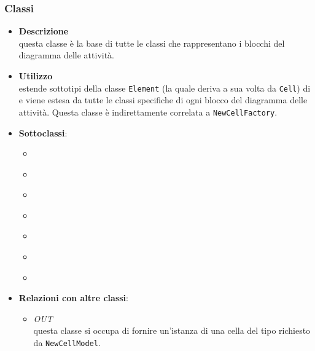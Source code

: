 \subsubsection{Classi}
\label{\nogloxy{swedesigner::client::model::celltypes::activity::ActivityDiagramElement}}
\begin{itemize}
\item \textbf{Descrizione}\\
questa classe è la base di tutte le classi che rappresentano i blocchi del diagramma delle attività.
\item \textbf{Utilizzo}\\
estende sottotipi della classe \texttt{Element} (la quale deriva a sua volta da \texttt{Cell})  di \jointjs{} e viene estesa da tutte le classi specifiche di ogni blocco del diagramma delle attività. Questa classe è indirettamente correlata a \texttt{NewCellFactory}.
\item \textbf{Sottoclassi}:
\begin{itemize}
\item \hyperref[\nogloxy{swedesigner::client::model::celltypes::activity::HxCustom}]{}
\item \hyperref[\nogloxy{swedesigner::client::model::celltypes::activity::HxElse}]{}
\item \hyperref[\nogloxy{swedesigner::client::model::celltypes::activity::HxFor}]{}
\item \hyperref[\nogloxy{swedesigner::client::model::celltypes::activity::HxIf}]{}
\item \hyperref[\nogloxy{swedesigner::client::model::celltypes::activity::HxReturn}]{}
\item \hyperref[\nogloxy{swedesigner::client::model::celltypes::activity::HxVariable}]{}
\item \hyperref[\nogloxy{swedesigner::client::model::celltypes::activity::HxWhile}]{}
\end{itemize}
\item \textbf{Relazioni con altre classi}:
\begin{itemize}
\item \textit{OUT} \hyperref[\nogloxy{swedesigner::client::model::NewCellFactory}]{}\\
questa classe si occupa di fornire un'istanza di una cella del tipo richiesto da \texttt{NewCellModel}. 

\end{itemize}
\end{itemize}

